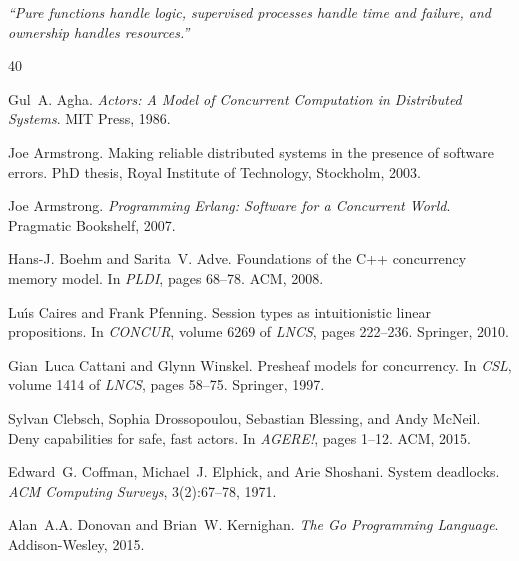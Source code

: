 \documentclass[11pt,a4paper]{article}
\begin{document}
\vspace{1em}
\noindent
\textit{``Pure functions handle logic, supervised processes handle time and failure, and ownership handles resources.''}




\begin{thebibliography}{40}

Gul~A. Agha.
\newblock \emph{Actors: A Model of Concurrent Computation in Distributed Systems}.
\newblock MIT Press, 1986.

Joe Armstrong.
\newblock Making reliable distributed systems in the presence of software errors.
\newblock PhD thesis, Royal Institute of Technology, Stockholm, 2003.

Joe Armstrong.
\newblock \emph{Programming Erlang: Software for a Concurrent World}.
\newblock Pragmatic Bookshelf, 2007.

Hans-J. Boehm and Sarita~V. Adve.
\newblock Foundations of the {C}++ concurrency memory model.
\newblock In \emph{PLDI}, pages 68--78. ACM, 2008.

Lu{\'\i}s Caires and Frank Pfenning.
\newblock Session types as intuitionistic linear propositions.
\newblock In \emph{CONCUR}, volume 6269 of \emph{LNCS}, pages 222--236. Springer, 2010.

Gian~Luca Cattani and Glynn Winskel.
\newblock Presheaf models for concurrency.
\newblock In \emph{CSL}, volume 1414 of \emph{LNCS}, pages 58--75. Springer, 1997.

Sylvan Clebsch, Sophia Drossopoulou, Sebastian Blessing, and Andy McNeil.
\newblock Deny capabilities for safe, fast actors.
\newblock In \emph{AGERE!}, pages 1--12. ACM, 2015.

Edward~G. Coffman, Michael~J. Elphick, and Arie Shoshani.
\newblock System deadlocks.
\newblock \emph{ACM Computing Surveys}, 3(2):67--78, 1971.

Alan~A.A. Donovan and Brian~W. Kernighan.
\newblock \emph{The Go Programming Language}.
\newblock Addison-Wesley, 2015.


\end{thebibliography}
\end{document}

